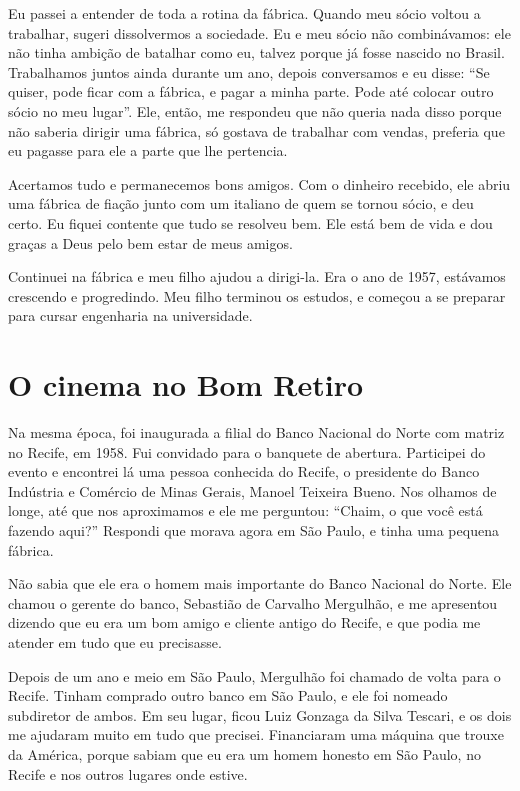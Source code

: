 Eu passei a entender de toda a rotina da fábrica. Quando meu sócio voltou a
trabalhar, sugeri dissolvermos a sociedade. Eu e
meu sócio não combinávamos: ele não tinha ambição de batalhar como eu,
talvez porque já fosse nascido no Brasil. Trabalhamos juntos
ainda durante um ano, depois conversamos e eu disse: ``Se quiser,
pode ficar com a fábrica, e pagar a minha parte. Pode até colocar outro
sócio no meu lugar''. Ele, então, me respondeu que não queria nada disso
porque não saberia dirigir uma fábrica, só gostava de trabalhar com
vendas, preferia que eu pagasse para ele a parte que lhe pertencia.

Acertamos tudo e permanecemos bons amigos. Com o dinheiro recebido, ele abriu uma fábrica de fiação junto com um italiano de quem se tornou sócio, e deu
certo. Eu fiquei contente que tudo se resolveu bem. Ele está bem de
vida e dou graças a Deus pelo bem estar de meus amigos.

Continuei na fábrica e meu filho ajudou a dirigi-la. Era o ano
de 1957, estávamos crescendo e progredindo. Meu filho
terminou os estudos, e começou a se preparar para cursar engenharia na universidade.

\chapter{O cinema no Bom Retiro}

Na mesma época, foi inaugurada a filial do Banco Nacional do Norte com
matriz no Recife, em 1958. Fui convidado para o
banquete de abertura. Participei do evento e encontrei lá uma pessoa conhecida do Recife, o presidente do Banco
Indústria e Comércio de Minas Gerais, Manoel Teixeira Bueno.
Nos olhamos de longe, até que nos aproximamos e ele me perguntou:
``Chaim, o que você está fazendo aqui?'' Respondi que morava agora em São
Paulo, e tinha uma pequena fábrica.

Não sabia que ele era o homem mais importante do Banco Nacional do
Norte. Ele chamou o gerente do banco, Sebastião de Carvalho Mergulhão, e
me apresentou dizendo que eu era um bom amigo e cliente antigo do
Recife, e que podia me atender em tudo que eu precisasse.

Depois de um ano e meio em São Paulo, Mergulhão foi chamado de volta
para o Recife. Tinham comprado outro banco em São Paulo, e
ele foi nomeado subdiretor de ambos. Em seu lugar, ficou Luiz Gonzaga da
Silva Tescari, e os dois me ajudaram muito em tudo que precisei.
Financiaram uma máquina que trouxe da América, porque sabiam que eu era
um homem honesto em São Paulo, no Recife e nos outros lugares onde estive.

